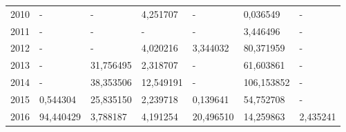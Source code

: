 \begin{table}
\begin{tabular}{p{1cm}p{2cm}p{2cm}p{2cm}p{2cm}p{2cm}p{2cm}}
 2010 &            - &               - &                         4,251707 &                                            - &                       0,036549 &                               - \\
 2011 &            - &               - &                                - &                                            - &                       3,446496 &                               - \\
 2012 &            - &               - &                         4,020216 &                                     3,344032 &                      80,371959 &                               - \\
 2013 &            - &       31,756495 &                         2,318707 &                                            - &                      61,603861 &                               - \\
 2014 &            - &       38,353506 &                        12,549191 &                                            - &                     106,153852 &                               - \\
 2015 &     0,544304 &       25,835150 &                         2,239718 &                                     0,139641 &                      54,752708 &                               - \\
 2016 &    94,440429 &        3,788187 &                         4,191254 &                                    20,496510 &                      14,259863 &                        2,435241 \\
\bottomrule
\end{tabular}
\end{table}
